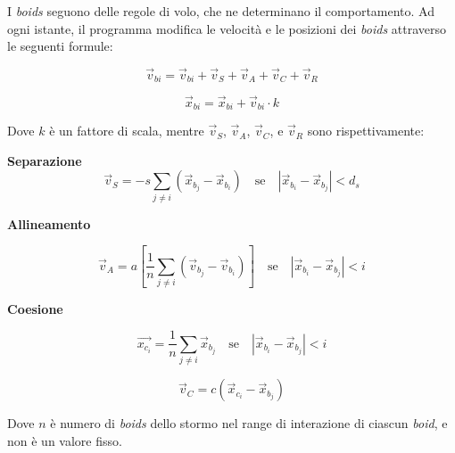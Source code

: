 \documentclass[10pt,a4paper]{article}
\begin{document}
I \textit{boids} seguono delle regole di volo, che ne determinano il comportamento. Ad ogni istante, il programma modifica le velocità e le posizioni dei \textit{boids} attraverso le seguenti formule:

\begin{equation*}
    \vec{v}_{bi} = \vec{v}_{bi} + \vec{v}_S + \vec{v}_A + \vec{v}_C + \vec{v}_R
\end{equation*}

\begin{equation*}
    \vec{x}_{bi} = \vec{x}_{bi} + \vec{v}_{bi} \cdot k
\end{equation*}

Dove $k$ è un fattore di scala, mentre $\vec{v}_S$, $\vec{v}_A$, $\vec{v}_C$, e $\vec{v}_R$ sono rispettivamente:

\vspace{2mm}

\textbf{Separazione}
\begin{equation*}
    \vec{v}_S = -s \sum_{j \neq i} (\vec{x}_{b_j} - \vec{x}_{b_i}) \quad \text{se} \quad \left| \vec{x}_{b_i} - \vec{x}_{b_j} \right| < d_s
\end{equation*}

\vspace{2mm}

\textbf{Allineamento}

\begin{equation*}
    \vec{v}_A = a \left[ \frac{1}{n} \sum_{j \neq i} (\vec{v}_{b_j} - \vec{v}_{b_i}) \right] \quad \text{se} \quad \left| \vec{x}_{b_i} - \vec{x}_{b_j} \right| < i
\end{equation*}

\vspace{2mm}

\textbf{Coesione}

\begin{equation*}
    \vec{x_{c_i}} = \frac{1}{n} \sum_{j \neq i} \vec{x}_{b_j} \quad \text{se} \quad \left| \vec{x}_{b_i} - \vec{x}_{b_j} \right| < i
\end{equation*}

\vspace{2mm}

\begin{equation*}
    \vec{v}_C = c (\vec{x}_{c_i} - \vec{x}_{b_j})
\end{equation*}

Dove $n$ è numero di \textit{boids} dello stormo nel range di interazione di ciascun \textit{boid}, e non è un valore fisso.
\end{document}
